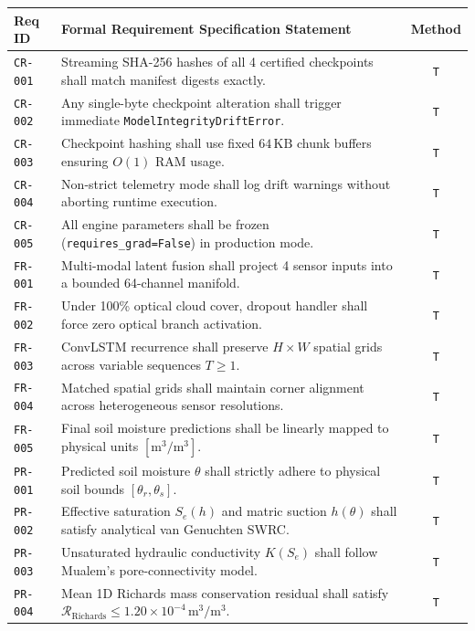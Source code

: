 \documentclass[11pt,a4paper]{article}
\theoremstyle{definition}
\theoremstyle{remark}
\begin{document}
\begin{table}[h!]
\centering
\scriptsize
\begin{tabular}{lp{8.5cm}c}
\toprule
\textbf{Req ID} & \textbf{Formal Requirement Specification Statement} & \textbf{Method} \\
\midrule
\texttt{CR-001} & Streaming SHA-256 hashes of all 4 certified checkpoints shall match manifest digests exactly. & \texttt{T} \\
\texttt{CR-002} & Any single-byte checkpoint alteration shall trigger immediate \texttt{ModelIntegrityDriftError}. & \texttt{T} \\
\texttt{CR-003} & Checkpoint hashing shall use fixed $64\,\text{KB}$ chunk buffers ensuring $O(1)$ RAM usage. & \texttt{T} \\
\texttt{CR-004} & Non-strict telemetry mode shall log drift warnings without aborting runtime execution. & \texttt{T} \\
\texttt{CR-005} & All engine parameters shall be frozen (\texttt{requires\_grad=False}) in production mode. & \texttt{T} \\
\texttt{FR-001} & Multi-modal latent fusion shall project 4 sensor inputs into a bounded 64-channel manifold. & \texttt{T} \\
\texttt{FR-002} & Under 100\% optical cloud cover, dropout handler shall force zero optical branch activation. & \texttt{T} \\
\texttt{FR-003} & ConvLSTM recurrence shall preserve $H \times W$ spatial grids across variable sequences $T \ge 1$. & \texttt{T} \\
\texttt{FR-004} & Matched spatial grids shall maintain corner alignment across heterogeneous sensor resolutions. & \texttt{T} \\
\texttt{FR-005} & Final soil moisture predictions shall be linearly mapped to physical units $[\text{m}^3/\text{m}^3]$. & \texttt{T} \\
\texttt{PR-001} & Predicted soil moisture $\theta$ shall strictly adhere to physical soil bounds $[\theta_r, \theta_s]$. & \texttt{T} \\
\texttt{PR-002} & Effective saturation $S_e(h)$ and matric suction $h(\theta)$ shall satisfy analytical van Genuchten SWRC. & \texttt{T} \\
\texttt{PR-003} & Unsaturated hydraulic conductivity $K(S_e)$ shall follow Mualem's pore-connectivity model. & \texttt{T} \\
\texttt{PR-004} & Mean 1D Richards mass conservation residual shall satisfy $\mathcal{R}_{\text{Richards}} \le 1.20 \times 10^{-4}\,\text{m}^3/\text{m}^3$. & \texttt{T} \\

\end{tabular}
\end{table}
\end{document}
